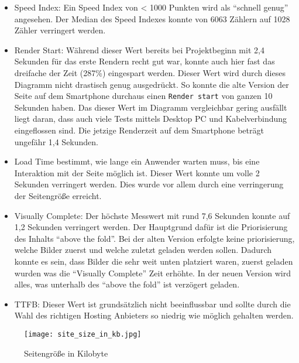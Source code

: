     \begin{itemize}
        \item Speed Index: Ein Speed Index von < 1000 Punkten wird als "`schnell genug"' angesehen. Der Median des Speed Indexes konnte von 6063 Zählern auf 1028 Zähler verringert werden. 
        \item Render Start: Während dieser Wert bereits bei Projektbeginn mit 2,4 Sekunden für das erste Rendern recht gut war, konnte auch hier fast das dreifache der Zeit (287\%) eingespart werden. Dieser Wert wird durch dieses Diagramm nicht drastisch genug ausgedrückt. So konnte die alte Version der Seite auf dem Smartphone durchaus einen \texttt{Render start} von ganzen 10 Sekunden haben. Das dieser Wert im Diagramm vergleichbar gering ausfällt liegt daran, dass auch viele Tests mittels Desktop PC und Kabelverbindung eingeflossen sind. Die jetzige Renderzeit auf dem Smartphone beträgt ungefähr 1,4 Sekunden. 
        \item Load Time bestimmt, wie lange ein Anwender warten muss, bis eine Interaktion mit der Seite möglich ist. Dieser Wert konnte um volle 2 Sekunden verringert werden. Dies wurde vor allem durch eine verringerung der Seitengröße erreicht.
        \item Visually Complete: Der höchste Messwert mit rund 7,6 Sekunden konnte auf 1,2 Sekunden verringert werden. Der Hauptgrund dafür ist die Priorisierung des Inhalts "`above the fold"'. Bei der alten Version erfolgte keine priorisierung, welche Bilder zuerst und welche zuletzt geladen werden sollen. Dadurch konnte es sein, dass Bilder die sehr weit unten platziert waren, zuerst geladen wurden was die "`Visually Complete"' Zeit erhöhte. In der neuen Version wird alles, was unterhalb des "`above the fold"' ist verzögert geladen.
        \item TTFB: Dieser Wert ist grundsätzlich nicht beeinflussbar und sollte durch die Wahl des richtigen Hosting Anbieters so niedrig wie möglich gehalten werden.
    \end{itemize}
    \pagebreak

		\begin{figure}[htbp]
			\begin{center}
				\texttt{[image: site\_size\_in\_kb.jpg]}
				\caption{Seitengröße in Kilobyte}
				\label{fig:site_size_in_kb}
			\end{center}
		\end{figure}


